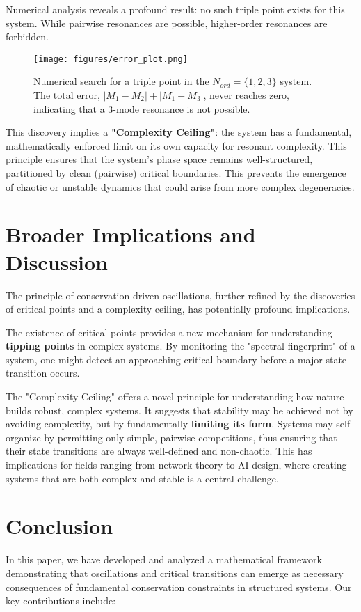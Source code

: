 \documentclass[11pt,a4paper]{article}
\begin{document}
Numerical analysis reveals a profound result: no such triple point exists for this system. While pairwise resonances are possible, higher-order resonances are forbidden.

\begin{figure}[H]
    \centering
    \texttt{[image: figures/error\_plot.png]}
    \caption{Numerical search for a triple point in the $N_{ord}=\{1,2,3\}$ system. The total error, $|M_1-M_2|+|M_1-M_3|$, never reaches zero, indicating that a 3-mode resonance is not possible.}
    \label{fig:error_plot}
\end{figure}

This discovery implies a \textbf{"Complexity Ceiling"}: the system has a fundamental, mathematically enforced limit on its own capacity for resonant complexity. This principle ensures that the system's phase space remains well-structured, partitioned by clean (pairwise) critical boundaries. This prevents the emergence of chaotic or unstable dynamics that could arise from more complex degeneracies.


\section{Broader Implications and Discussion}
The principle of conservation-driven oscillations, further refined by the discoveries of critical points and a complexity ceiling, has potentially profound implications.

The existence of critical points provides a new mechanism for understanding \textbf{tipping points} in complex systems. By monitoring the "spectral fingerprint" of a system, one might detect an approaching critical boundary before a major state transition occurs.

The "Complexity Ceiling" offers a novel principle for understanding how nature builds robust, complex systems. It suggests that stability may be achieved not by avoiding complexity, but by fundamentally \textbf{limiting its form}. Systems may self-organize by permitting only simple, pairwise competitions, thus ensuring that their state transitions are always well-defined and non-chaotic. This has implications for fields ranging from network theory to AI design, where creating systems that are both complex and stable is a central challenge.

\section{Conclusion}
In this paper, we have developed and analyzed a mathematical framework demonstrating that oscillations and critical transitions can emerge as necessary consequences of fundamental conservation constraints in structured systems. Our key contributions include:
\end{document}
